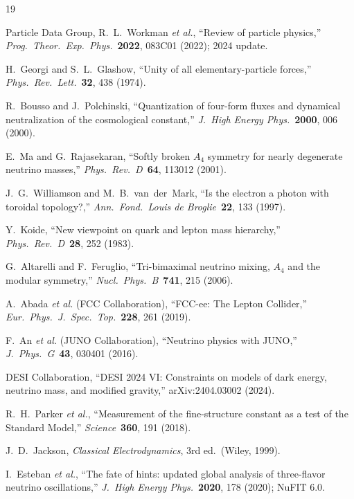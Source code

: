 \documentclass[11pt,a4paper]{article}
\begin{document}
\begin{thebibliography}{19}

Particle Data Group, R.~L.~Workman \emph{et al.},
``Review of particle physics,''
\emph{Prog.\ Theor.\ Exp.\ Phys.}\ \textbf{2022}, 083C01 (2022); 2024 update.

H.~Georgi and S.~L.~Glashow,
``Unity of all elementary-particle forces,''
\emph{Phys.\ Rev.\ Lett.}\ \textbf{32}, 438 (1974).

R.~Bousso and J.~Polchinski,
``Quantization of four-form fluxes and dynamical neutralization of the cosmological constant,''
\emph{J.\ High Energy Phys.}\ \textbf{2000}, 006 (2000).

E.~Ma and G.~Rajasekaran,
``Softly broken $A_4$ symmetry for nearly degenerate neutrino masses,''
\emph{Phys.\ Rev.\ D}\ \textbf{64}, 113012 (2001).

J.~G.~Williamson and M.~B.~van~der~Mark,
``Is the electron a photon with toroidal topology?,''
\emph{Ann.\ Fond.\ Louis de Broglie}\ \textbf{22}, 133 (1997).

Y.~Koide,
``New viewpoint on quark and lepton mass hierarchy,''
\emph{Phys.\ Rev.\ D}\ \textbf{28}, 252 (1983).

G.~Altarelli and F.~Feruglio,
``Tri-bimaximal neutrino mixing, $A_4$ and the modular symmetry,''
\emph{Nucl.\ Phys.\ B}\ \textbf{741}, 215 (2006).

A.~Abada \emph{et al.} (FCC Collaboration),
``FCC-ee: The Lepton Collider,''
\emph{Eur.\ Phys.\ J.\ Spec.\ Top.}\ \textbf{228}, 261 (2019).

F.~An \emph{et al.} (JUNO Collaboration),
``Neutrino physics with JUNO,''
\emph{J.\ Phys.\ G}\ \textbf{43}, 030401 (2016).

DESI Collaboration,
``DESI 2024 VI: Constraints on models of dark energy, neutrino mass, and modified gravity,''
arXiv:2404.03002 (2024).

R.~H.~Parker \emph{et al.},
``Measurement of the fine-structure constant as a test of the Standard Model,''
\emph{Science}\ \textbf{360}, 191 (2018).

J.~D.~Jackson,
\emph{Classical Electrodynamics}, 3rd ed.\ (Wiley, 1999).

I.~Esteban \emph{et al.},
``The fate of hints: updated global analysis of three-flavor neutrino oscillations,''
\emph{J.\ High Energy Phys.}\ \textbf{2020}, 178 (2020); NuFIT 6.0.


\end{thebibliography}
\end{document}
